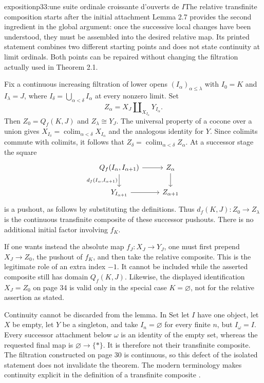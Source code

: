 \begin{dcomment}{exposition}{p33:une suite ordinale croissante d'ouverts de $I$}{The relative transfinite composition starts after the initial attachment}
Lemma 2.7 provides the second ingredient in the global argument: once the successive local changes have been understood, they must be assembled into the desired relative map. Its printed statement combines two different starting points and does not state continuity at limit ordinals. Both points can be repaired without changing the filtration actually used in Theorem 2.1.

Fix a continuous increasing filtration of lower opens $(I_\alpha)_{\alpha\leq\lambda}$ with $I_0=K$ and $I_\lambda=J$, where $I_\delta=\bigcup_{\alpha<\delta}I_\alpha$ at every nonzero limit. Set
\[
 Z_\alpha=X_J\amalg_{X_{I_\alpha}}Y_{I_\alpha}.
\]
Then $Z_0=Q_f(K,J)$ and $Z_\lambda\cong Y_J$. The universal property of a cocone over a union gives $X_{I_\delta}=\operatorname{colim}_{\alpha<\delta}X_{I_\alpha}$ and the analogous identity for $Y$. Since colimits commute with colimits, it follows that $Z_\delta=\operatorname{colim}_{\alpha<\delta}Z_\alpha$. At a successor stage the square
\[
\begin{tikzcd}
 Q_f(I_\alpha,I_{\alpha+1}) \arrow[r] \arrow[d,"{d_f(I_\alpha,I_{\alpha+1})}"'] & Z_\alpha \arrow[d] \\
 Y_{I_{\alpha+1}} \arrow[r] & Z_{\alpha+1}
\end{tikzcd}
\]
is a pushout, as follows by substituting the definitions. Thus $d_f(K,J):Z_0\to Z_\lambda$ is the continuous transfinite composite of these successor pushouts. There is no additional initial factor involving $f_K$.

If one wants instead the absolute map $f_J:X_J\to Y_J$, one must first prepend $X_J\to Z_0$, the pushout of $f_K$, and then take the relative composite. This is the legitimate role of an extra index $-1$. It cannot be included while the asserted composite still has domain $Q_f(K,J)$. Likewise, the displayed identification $X_J=Z_0$ on page 34 is valid only in the special case $K=\varnothing$, not for the relative assertion as stated.

Continuity cannot be discarded from the lemma. In $\mathrm{Set}$ let $I$ have one object, let $X$ be empty, let $Y$ be a singleton, and take $I_n=\varnothing$ for every finite $n$, but $I_\omega=I$. Every successor attachment below $\omega$ is an identity of the empty set, whereas the requested final map is $\varnothing\to\{*\}$. It is therefore not their transfinite composite. The filtration constructed on page 30 is continuous, so this defect of the isolated statement does not invalidate the theorem. The modern terminology makes continuity explicit in the definition of a transfinite composite \citep[Definition 5.3]{RiehlVerity2014Reedy}.
\end{dcomment}

